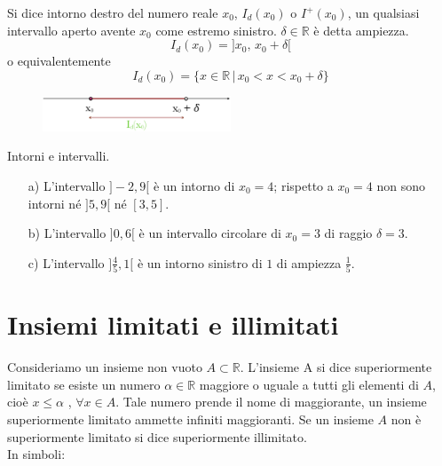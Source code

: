 \begin{definizione}
  Si dice intorno destro del numero reale \(x_0\), \(I_d(x_0)\) o 
\(I^+(x_0)\), un qualsiasi intervallo aperto avente \(x_0\) come estremo 
sinistro. \(\delta\in\mathbb{R}\) è detta ampiezza.
\begin{equation}
  I_d(x_0)=]x_0,\,x_0+\delta[
\end{equation}
o equivalentemente
\begin{equation}
  I_d(x_0)=\{x\in \mathbb{R}\,\vert\, x_0 < x<x_0+\delta\}
\end{equation}
\end{definizione}

\begin{figure}[h!]
  \centering
  \includegraphics[width=0.5\textwidth]{img/top_4a.png}%
\end{figure}

\begin{esempio} Intorni e intervalli.
\begin{itemize}
  \item[a)] L'intervallo \(]-2, 9[\) è un intorno di \(x_0=4\); rispetto a 
\(x_0=4\) non sono intorni né \(]5, 9[\) né \([3, 5]\).
  \item[b)] L'intervallo \(]0, 6[\) è un intervallo circolare di \(x_0=3\) 
di raggio \(\delta=3\).
  \item[c)] L'intervallo \(]\frac{4}{5},1[\) è un intorno sinistro di \(1\) 
di ampiezza \(\frac{1}{5}\). 
\end{itemize}
\end{esempio}

\section{Insiemi limitati e illimitati}
Consideriamo un insieme non vuoto \(A\subset \mathbb{R}\). 
L'insieme A si dice superiormente limitato se esiste un numero 
\(\alpha \in \mathbb{R}\) maggiore o uguale a tutti gli elementi di \(A\), 
cioè \(x\leq\alpha\) , \(\forall x\in A\). 
Tale numero prende il nome di maggiorante, un insieme superiormente limitato 
ammette infiniti maggioranti. Se un insieme \(A\) non è superiormente 
limitato si dice superiormente illimitato.\\
In simboli:

